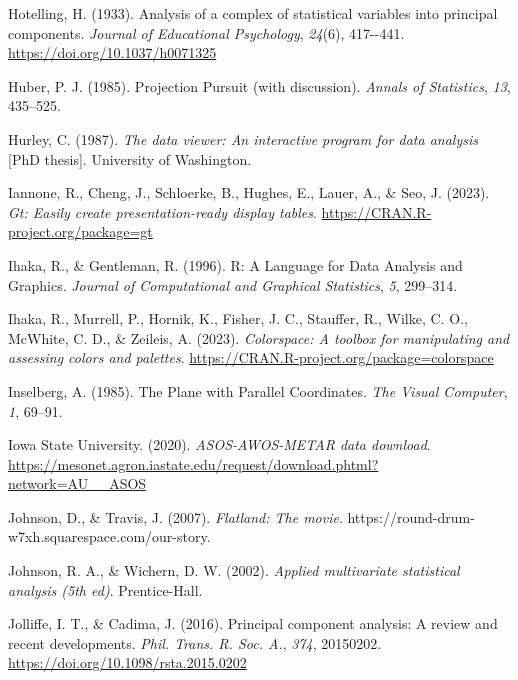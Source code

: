 \documentclass[
  letterpaper,
]{krantz}
\newlength{\cslhangindent}
\newlength{\cslentryspacingunit} %
\newenvironment{CSLReferences}[2] %
 {%
  \setlength{\parindent}{0pt}
  \ifodd #1
  \let\oldpar\par
  \def\par{\hangindent=\cslhangindent\oldpar}
  \fi
  \setlength{\parskip}{#2\cslentryspacingunit}
 }%
 {}
\begin{document}
\begin{CSLReferences}{1}{0}
\leavevmode{}%
Hotelling, H. (1933). Analysis of a complex of statistical variables
into principal components. \emph{Journal of Educational Psychology},
\emph{24}(6), 417-\/-441. \url{https://doi.org/10.1037/h0071325}

\leavevmode{}%
Huber, P. J. (1985). {P}rojection {P}ursuit (with discussion).
\emph{Annals of Statistics}, \emph{13}, 435--525.

\leavevmode{}%
Hurley, C. (1987). \emph{The data viewer: An interactive program for
data analysis} {[}PhD thesis{]}. University of Washington.

\leavevmode{}%
Iannone, R., Cheng, J., Schloerke, B., Hughes, E., Lauer, A., \& Seo, J.
(2023). \emph{Gt: Easily create presentation-ready display tables}.
\url{https://CRAN.R-project.org/package=gt}

\leavevmode{}%
Ihaka, R., \& Gentleman, R. (1996). R: {A} {L}anguage for {D}ata
{A}nalysis and {G}raphics. \emph{Journal of Computational and Graphical
Statistics}, \emph{5}, 299--314.

\leavevmode{}%
Ihaka, R., Murrell, P., Hornik, K., Fisher, J. C., Stauffer, R., Wilke,
C. O., McWhite, C. D., \& Zeileis, A. (2023). \emph{Colorspace: A
toolbox for manipulating and assessing colors and palettes}.
\url{https://CRAN.R-project.org/package=colorspace}

\leavevmode{}%
Inselberg, A. (1985). {T}he {P}lane with {P}arallel {C}oordinates.
\emph{The Visual Computer}, \emph{1}, 69--91.

\leavevmode{}%
Iowa State University. (2020). \emph{ASOS-AWOS-METAR data download}.
\url{https://mesonet.agron.iastate.edu/request/download.phtml?network=AU__ASOS}

\leavevmode{}%
Johnson, D., \& Travis, J. (2007). \emph{Flatland: The movie}.
https://round-drum-w7xh.squarespace.com/our-story.

\leavevmode{}%
Johnson, R. A., \& Wichern, D. W. (2002). \emph{Applied multivariate
statistical analysis (5th ed)}. Prentice-Hall.

\leavevmode{}%
Jolliffe, I. T., \& Cadima, J. (2016). Principal component analysis: A
review and recent developments. \emph{Phil. Trans. R. Soc. A.},
\emph{374}, 20150202. \url{https://doi.org/10.1098/rsta.2015.0202}


\end{CSLReferences}
\end{document}
